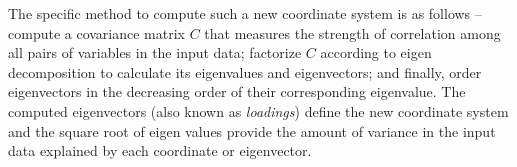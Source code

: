 The specific method to compute such a new coordinate system is as follows -- compute a covariance matrix $C$ that measures the strength of correlation among all pairs of variables in the input data; factorize $C$ according to eigen decomposition to calculate its eigenvalues and eigenvectors; and finally, order eigenvectors in the decreasing order of their corresponding eigenvalue. The computed eigenvectors (also known as {\em loadings}) define the new coordinate system and the square root of eigen values provide the amount of variance in the input data explained by each coordinate or eigenvector. 
\\

\begin{comment}
\begin{table}
\parbox{.35\linewidth}{
\centering
\begin{tabular}{cc}
  \hline
  x & y \\
  \hline
  2.5 & 2.4  \\
  0.5 & 0.7  \\
  2.2 & 2.9  \\
  1.9 & 2.2  \\
  3.1 & 3.0  \\
  2.3 & 2.7  \\
  2 & 1.6  \\
  1 & 1.1  \\
  1.5 & 1.6  \\
  1.1 & 0.9  \\
	\hline
\end{tabular}
\caption{Input Data}
\label{tab:pca_data}
}
\hfill
\parbox{.55\linewidth}{
\centering
\begin{tabular}{cc}
  \hline
  x & y \\
  \hline
  .69  & .49  \\
  -1.31  & -1.21  \\
  .39  & .99  \\
  .09  & .29  \\
  1.29  & 1.09  \\
  .49  & .79  \\
  .19  & -.31  \\
  -.81  & -.81  \\
  -.31  & -.31  \\
  -.71  & -1.01  \\
  \hline
\end{tabular}
\caption{Data after centering and scaling}
\label{tab:pca_scaled_data}
}
\end{table}
\end{comment}

